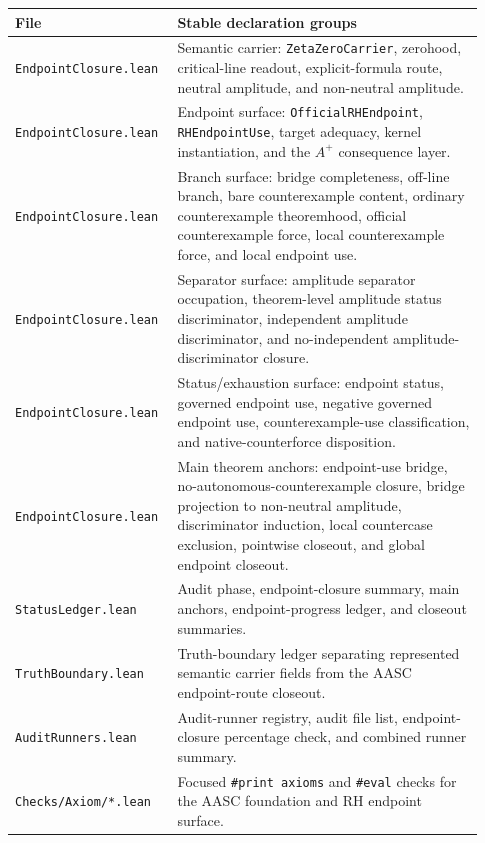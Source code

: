 \documentclass[11pt]{article}
\begin{document}
\begin{longtable}{@{}L{0.30\linewidth}L{0.63\linewidth}@{}}
\toprule
File & Stable declaration groups \\
\midrule
\texttt{EndpointClosure.lean} & Semantic carrier: \texttt{ZetaZeroCarrier}, zerohood, critical-line readout, explicit-formula route, neutral amplitude, and non-neutral amplitude. \\
\texttt{EndpointClosure.lean} & Endpoint surface: \texttt{OfficialRHEndpoint}, \texttt{RHEndpointUse}, target adequacy, kernel instantiation, and the \(A^+\) consequence layer. \\
\texttt{EndpointClosure.lean} & Branch surface: bridge completeness, off-line branch, bare counterexample content, ordinary counterexample theoremhood, official counterexample force, local counterexample force, and local endpoint use. \\
\texttt{EndpointClosure.lean} & Separator surface: amplitude separator occupation, theorem-level amplitude status discriminator, independent amplitude discriminator, and no-independent amplitude-discriminator closure. \\
\texttt{EndpointClosure.lean} & Status/exhaustion surface: endpoint status, governed endpoint use, negative governed endpoint use, counterexample-use classification, and native-counterforce disposition. \\
\texttt{EndpointClosure.lean} & Main theorem anchors: endpoint-use bridge, no-autonomous-counterexample closure, bridge projection to non-neutral amplitude, discriminator induction, local countercase exclusion, pointwise closeout, and global endpoint closeout. \\
\texttt{StatusLedger.lean} & Audit phase, endpoint-closure summary, main anchors, endpoint-progress ledger, and closeout summaries. \\
\texttt{TruthBoundary.lean} & Truth-boundary ledger separating represented semantic carrier fields from the AASC endpoint-route closeout. \\
\texttt{AuditRunners.lean} & Audit-runner registry, audit file list, endpoint-closure percentage check, and combined runner summary. \\
\texttt{Checks/Axiom/*.lean} & Focused \texttt{\#print axioms} and \texttt{\#eval} checks for the AASC foundation and RH endpoint surface. \\
\bottomrule
\end{longtable}
\end{document}
